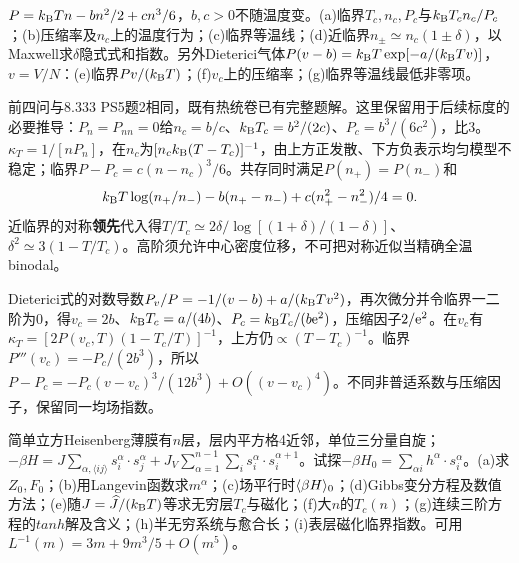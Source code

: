 \begin{exercise}[原题1(a)--(g)]\label{p:334-1-1}
$P=k_{\mathrm B} Tn-bn^2/2+cn^3/6$，$b,c>0$不随温度变。(a)临界$T_c,n_c,P_c$与$k_{\mathrm B} T_cn_c/P_c$；(b)压缩率及$n_c$上的温度行为；(c)临界等温线；(d)近临界$n_\pm\simeq n_c(1\pm\delta)$，以Maxwell求$\delta$隐式式和指数。另外Dieterici气体$P(v-b)=k_{\mathrm B} T\exp[-a/(k_{\mathrm B} Tv)]$，$v=V/N$：(e)临界$Pv/(k_{\mathrm B} T)$；(f)$v_c$上的压缩率；(g)临界等温线最低非零项。
\end{exercise}
\begin{solution}
前四问与8.333 PS5题2相同，既有热统卷已有完整题解。这里保留用于后续标度的必要推导：$P_n=P_{nn}=0$给$n_c=b/c$、$k_{\mathrm B} T_c=b^2/(2c)$、$P_c=b^3/(6c^2)$，比3。$\kappa_T=1/[nP_n]$，在$n_c$为$[n_ck_{\mathrm B}(T-T_c)]^{-1}$，由上方正发散、下方负表示均匀模型不稳定；临界$P-P_c=c(n-n_c)^3/6$。共存同时满足$P(n_+)=P(n_-)$和
\begin{equation}
k_{\mathrm B} T\log(n_+/n_-)-b(n_+-n_-)+c(n_+^2-n_-^2)/4=0.
\end{equation}
近临界的对称\textbf{领先}代入得$T/T_c\simeq2\delta/\log[(1+\delta)/(1-\delta)]$、$\delta^2\simeq3(1-T/T_c)$。高阶须允许中心密度位移，不可把对称近似当精确全温binodal。

Dieterici式的对数导数$P_v/P=-1/(v-b)+a/(k_{\mathrm B} Tv^2)$，再次微分并令临界一二阶为0，得$v_c=2b$、$k_{\mathrm B} T_c=a/(4b)$、$P_c=k_{\mathrm B} T_c/(b\mathrm e^2)$，压缩因子$2/\mathrm e^2$。在$v_c$有$\kappa_T=[2P(v_c,T)(1-T_c/T)]^{-1}$，上方仍$\propto(T-T_c)^{-1}$。临界$P'''(v_c)=-P_c/(2b^3)$，所以$P-P_c=-P_c(v-v_c)^3/(12b^3)+O((v-v_c)^4)$。不同非普适系数与压缩因子，保留同一均场指数。
\end{solution}
\begin{exercise}[原题2(a)--(i)]\label{p:334-1-2}
简单立方Heisenberg薄膜有$n$层，层内平方格4近邻，单位三分量自旋；$-\beta H=J\sum_{\alpha,\langle ij\rangle}s_i^\alpha\cdot s_j^\alpha+J_V\sum_{\alpha=1}^{n-1}\sum_i s_i^\alpha\cdot s_i^{\alpha+1}$。试探$-\beta H_0=\sum_{\alpha i}h^\alpha\cdot s_i^\alpha$。(a)求$Z_0,F_0$；(b)用Langevin函数求$m^\alpha$；(c)场平行时$\langle \beta H\rangle_0$；(d)Gibbs变分方程及数值方法；(e)随$J=\widehat J/(k_{\mathrm B} T)$等求无穷层$T_c$与磁化；(f)大$n$的$T_c(n)$；(g)连续三阶方程的$tanh$解及含义；(h)半无穷系统与愈合长；(i)表层磁化临界指数。可用$L^{-1}(m)=3m+9m^3/5+O(m^5)$。
\end{exercise}
